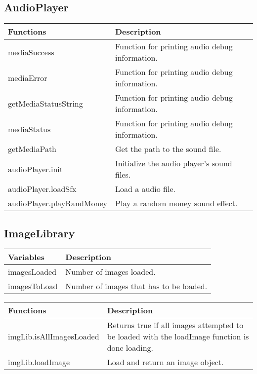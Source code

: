 	



\subsection*{AudioPlayer}

	\begin{table}[H]
	\begin{tabular}{p{4cm} | p{8cm} }
	\hline
	\rowcolor{gray}
	Functions & Description \\ \hline
	mediaSuccess & Function for printing audio debug information. \\ \hline
	mediaError & Function for printing audio debug information. \\ \hline
	getMediaStatusString & Function for printing audio debug information. \\ \hline
	mediaStatus & Function for printing audio debug information. \\ \hline
	getMediaPath & Get the path to the sound file.  \\ \hline
	audioPlayer.init & Initialize the audio player's sound files. \\ \hline
	audioPlayer.loadSfx & Load a audio file. \\ \hline
	audioPlayer.playRandMoney & Play a random money sound effect. \\ \hline
	\end{tabular}
	\end{table}



\subsection*{ImageLibrary}
	
	\begin{table}[H]
	\begin{tabular}{p{4cm} | p{8cm} }
	\hline
	\rowcolor{gray}
	Variables & Description \\ \hline
	imagesLoaded & Number of images loaded. \\ \hline
	imagesToLoad & Number of images that has to be loaded. \\ \hline
	\end{tabular}
	\end{table}

	\begin{table}[H]
	\begin{tabular}{p{4cm} | p{8cm} }
	\hline
	\rowcolor{gray}
	Functions & Description \\ \hline
	imgLib.isAllImagesLoaded & Returns true if all images attempted to be loaded with the loadImage function is done loading. \\ \hline	
	imgLib.loadImage & Load and return an image object. \\ \hline	
	\end{tabular}
	\end{table}

